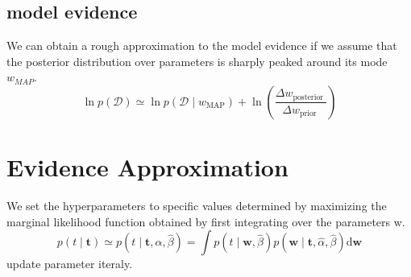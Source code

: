 \documentclass{article}
\begin{document}
\subsection{model evidence}
We can obtain a rough approximation to the model evidence if we assume that the posterior distribution over parameters is sharply peaked around its mode $w_{MAP}$.
$$
\ln p(\mathcal{D}) \simeq \ln p\left(\mathcal{D} \mid w_{\mathrm{MAP}}\right)+\ln \left(\frac{\Delta w_{\text {posterior }}}{\Delta w_{\text {prior }}}\right)
$$

\section{Evidence Approximation}
We set the hyperparameters to speciﬁc values determined by maximizing the marginal likelihood function obtained by ﬁrst integrating over the parameters w.
$$
p(t \mid \mathbf{t}) \simeq p(t \mid \mathbf{t}, \widehat{\alpha}, \widehat{\beta})=\int p(t \mid \mathbf{w}, \widehat{\beta}) p(\mathbf{w} \mid \mathbf{t}, \widehat{\alpha}, \widehat{\beta}) \mathrm{d} \mathbf{w}
$$
update parameter iteraly.


\appendix
\end{document}
